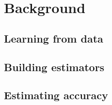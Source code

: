 \chapter{Background}\label{ch:background}

\section{Learning from data}

\section{Building estimators}

\section{Estimating accuracy}

\lipsum[1]
